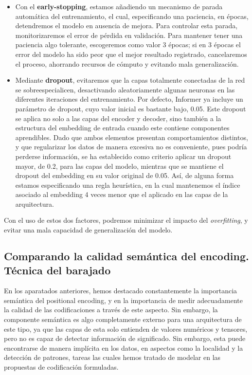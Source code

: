 \begin{itemize}
	\item Con el \textbf{early-stopping}, estamos añadiendo un mecanismo de parada automática del entrenamiento, el cual, especificando una paciencia, en épocas, detendremos el modelo en ausencia de mejora. Para controlar esta parada, monitorizaremos el error de pérdida en validación. Para mantener tener una paciencia algo tolerante, escogeremos como valor 3 épocas; si en 3 épocas el error del modelo ha sido peor que el mejor resultado registrado, cancelaremos el proceso, ahorrando recursos de cómputo y evitando mala generalización.
	\item Mediante \textbf{dropout}, evitaremos que la capas totalmente conectadas de la red se sobreespecialicen, desactivando aleatoriamente algunas neuronas en las diferentes iteraciones del entrenamiento. Por defecto, Informer ya incluye un parámetro de dropout, cuyo valor inicial es bastante bajo, 0.05. Este dropout se aplica no solo a las capas del encoder y decoder, sino también a la estructura del embedding de entrada cuando este contiene componentes aprendibles. Dado que ambos elementos presentan comportamientos distintos, y que regularizar los datos de manera excesiva no es conveniente, pues podría perderse información, se ha establecido como criterio aplicar un dropout mayor, de 0.2, para las capas del modelo, mientras que se mantiene el dropout del embedding en su valor original de 0.05. Así, de alguna forma estamos especificando una regla heurística, en la cual mantenemos el índice asociado al embedding 4 veces menor que el aplicado en las capas de la arquitectura.
\end{itemize}

Con el uso de estos dos factores, podremos minimizar el impacto del \textit{overfitting}, y evitar una mala capacidad de generalización del modelo.

\subsection{Comparando la calidad semántica del encoding. Técnica del barajado}

En los aparatados anteriores, hemos destacado constantemente la importancia semántica del positional encoding, y en la importancia de medir adecuadamente la calidad de las codificaciones a través de este aspecto. Sin embargo, la componente semántica es algo completamente externo para una arquitectura de este tipo, ya que las capas de esta solo entienden de valores numéricos y tensores, pero no es capaz de detectar información de significado. Sin embargo, esta puede encontrarse de manera implícita en los datos, en aspectos como la localidad y la detección de patrones, tareas las cuales hemos tratado de modelar en las propuestas de codificación formuladas.\\

